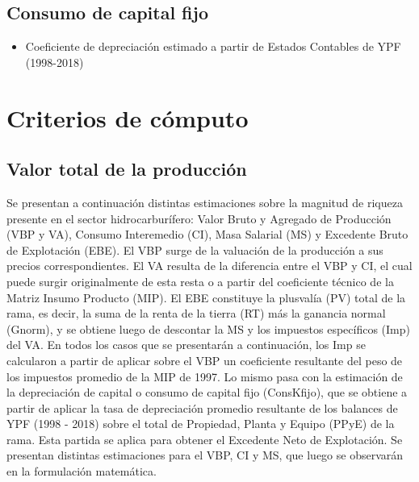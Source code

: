 \documentclass[letterpaper,11pt, spanish]{scrartcl}
\begin{document}
\subsection{Consumo de capital fijo}
\begin{itemize}
    \item Coeficiente de depreciación estimado a partir de Estados Contables de YPF (1998-2018)
\end{itemize}




\section{Criterios de cómputo}


\subsection{Valor total de la producción }
Se presentan a continuación distintas estimaciones sobre la magnitud de riqueza presente en el sector hidrocarburífero: Valor Bruto y Agregado de Producción (VBP y VA), Consumo Interemedio (CI), Masa Salarial (MS) y Excedente Bruto de Explotación (EBE). El VBP surge de la valuación de la producción a sus precios correspondientes. El VA resulta de la diferencia entre el VBP y CI, el cual puede surgir originalmente de esta resta o a partir del coeficiente técnico de la Matriz Insumo Producto (MIP). El EBE constituye la plusvalía (PV) total de la rama, es decir, la suma de la renta de la tierra (RT) más la ganancia normal (Gnorm), y se obtiene luego de descontar la MS y los impuestos específicos (Imp) del VA. En todos los casos que se presentarán a continuación, los Imp se calcularon a partir de aplicar sobre el VBP un coeficiente  resultante del peso de los impuestos promedio de la  MIP de 1997. Lo mismo pasa con la estimación de la depreciación de capital o consumo de capital fijo (ConsKfijo), que se obtiene a partir de aplicar la tasa de depreciación promedio resultante de los balances de YPF (1998 - 2018) sobre el total de Propiedad, Planta y Equipo (PPyE) de la rama. Esta partida se aplica para obtener el Excedente Neto de Explotación. Se presentan distintas estimaciones para el VBP, CI y MS, que luego se observarán en la formulación matemática.
\end{document}
